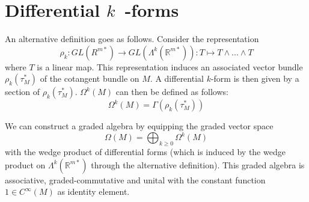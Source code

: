 \section{Differential \texorpdfstring{$k$}{k}\ -forms}

	
	\begin{adefinition}
		An alternative definition goes as follows. Consider the representation \[\rho_k:GL(R^{m*})\rightarrow GL(\Lambda^k(\mathbb{R}^{m*})): T\mapsto T\wedge...\wedge T\] where $T$ is a linear map. This representation induces an associated vector bundle\footnotemark\ $\rho_k(\tau_M^*)$ of the cotangent bundle on $M$. A differential $k$-form is then given by a section of $\rho_k(\tau_M^*)$. $\Omega^k(M)$ can then be defined as follows: \[\Omega^k(M) = \Gamma(\rho_k(\tau_M^*))\]
	\end{adefinition}
	
	\begin{construct}
		We can construct a graded algebra by equipping the graded vector space
		\begin{equation}
			\Omega(M) = \bigoplus_{k\geq0}\Omega^k(M)
		\end{equation}
		with the wedge product of differential forms (which is induced by the wedge product on $\Lambda^k(\mathbb{R}^{m*})$ through the alternative definition). This graded algebra is associative, graded-commutative and unital with the constant function $1\in C^{\infty}(M)$ as identity element.
	\end{construct}


